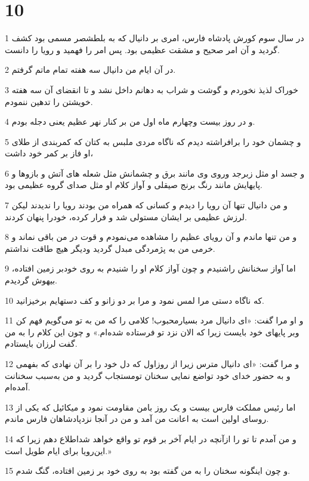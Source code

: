 \chapter{10}

\par 1 در سال سوم کورش پادشاه فارس، امری بر دانیال که به بلطشصر مسمی بود کشف گردید و آن امر صحیح و مشقت عظیمی بود. پس امر را فهمید و رویا را دانست.
\par 2 در آن ایام من دانیال سه هفته تمام ماتم گرفتم.
\par 3 خوراک لذیذ نخوردم و گوشت و شراب به دهانم داخل نشد و تا انقضای آن سه هفته خویشتن را تدهین ننمودم.
\par 4 و در روز بیست وچهارم ماه اول من بر کنار نهر عظیم یعنی دجله بودم.
\par 5 و چشمان خود را برافراشته دیدم که ناگاه مردی ملبس به کتان که کمربندی از طلای او فاز بر کمر خود داشت،
\par 6 و جسد او مثل زبرجد وروی وی مانند برق و چشمانش مثل شعله های آتش و بازوها و پایهایش مانند رنگ برنج صیقلی و آواز کلام او مثل صدای گروه عظیمی بود.
\par 7 و من دانیال تنها آن رویا را دیدم و کسانی که همراه من بودند رویا را ندیدند لیکن لرزش عظیمی بر ایشان مستولی شد و فرار کرده، خودرا پنهان کردند.
\par 8 و من تنها ماندم و آن رویای عظیم را مشاهده می‌نمودم و قوت در من باقی نماند و خرمی من به پژمردگی مبدل گردید ودیگر هیچ طاقت نداشتم.
\par 9 اما آواز سخنانش راشنیدم و چون آواز کلام او را شنیدم به روی خودبر زمین افتاده، بیهوش گردیدم.
\par 10 که ناگاه دستی مرا لمس نمود و مرا بر دو زانو و کف دستهایم برخیزانید.
\par 11 و او مرا گفت: «ای دانیال مرد بسیارمحبوب! کلامی را که من به تو می‌گویم فهم کن وبر پایهای خود بایست زیرا که الان نزد تو فرستاده شده‌ام.» و چون این کلام را به من گفت لرزان بایستادم.
\par 12 و مرا گفت: «ای دانیال مترس زیرا از روزاول که دل خود را بر آن نهادی که بفهمی و به حضور خدای خود تواضع نمایی سخنان تومستجاب گردید و من به‌سبب سخنانت آمده‌ام.
\par 13 اما رئیس مملکت فارس بیست و یک روز بامن مقاومت نمود و میکائیل که یکی از روسای اولین است به اعانت من آمد و من در آنجا نزدپادشاهان فارس ماندم.
\par 14 و من آمدم تا تو را ازآنچه در ایام آخر بر قوم تو واقع خواهد شداطلاع دهم زیرا که این‌رویا برای ایام طویل است.»
\par 15 و چون اینگونه سخنان را به من گفته بود به روی خود بر زمین افتاده، گنگ شدم.
